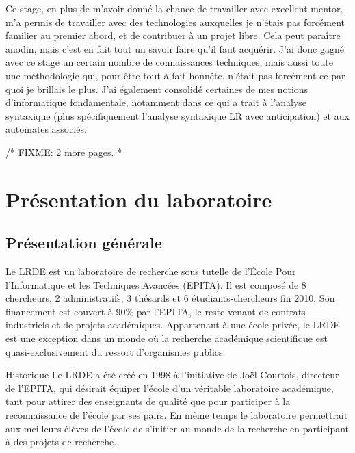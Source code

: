 \documentclass[a4paper,11pt,twoside,final]{article}
\begin{document}
  Ce stage, en plus de m'avoir donné la chance de travailler avec excellent
  mentor, m'a permis de travailler avec des technologies auxquelles je n'étais
  pas forcément familier au premier abord, et de contribuer à un projet libre.
  Cela peut paraître anodin, mais c'est en fait tout un savoir faire qu'il faut
  acquérir. J'ai donc gagné avec ce stage un certain nombre de connaissances
  techniques, mais aussi toute une méthodologie qui, pour être tout à fait
  honnête, n'était pas forcément ce par quoi je brillais le plus. J'ai
  également consolidé certaines de mes notions d'informatique fondamentale,
  notamment dans ce qui a trait à l'analyse syntaxique (plus spécifiquement
  l'analyse syntaxique LR avec anticipation) et aux automates associés.

  /* FIXME: 2 more pages. *

  \cleardoublepage
  \section{Présentation du laboratoire}
  \subsection{Présentation générale}

  Le LRDE est un laboratoire de recherche sous tutelle de l'École Pour
  l'Informatique et les Techniques Avancées (EPITA). Il est composé de 8
  chercheurs, 2 administratifs, 3 thésards et 6 étudiants-chercheurs fin 2010.
  Son financement est couvert à 90\% par l'EPITA, le reste venant de contrats
  industriels et de projets académiques.  Appartenant à une école privée, le LRDE
  est une exception dans un monde où la recherche académique scientifique est
  quasi-exclusivement du ressort d'organismes publics.

  Historique Le LRDE a été créé en 1998 à l'initiative de Joël Courtois,
  directeur de l'EPITA, qui désirait équiper l'école d’un véritable laboratoire
  académique, tant pour attirer des enseignants de qualité que pour participer à
  la reconnaissance de l'école par ses pairs. En même temps le laboratoire
  permettrait aux meilleurs élèves de l'école de s'initier au monde de la
  recherche en participant à des projets de recherche.
\end{document}
